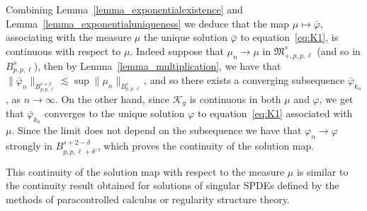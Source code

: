 \documentclass[a4paper,10pt]{article}
\begin{document}
\begin{remark}
  Combining Lemma~\ref{lemma_exponentialexistence} and
  Lemma~\ref{lemma_exponentialuniqueness} we deduce that the map $\mu
  \longmapsto \bar{\varphi}$, associating with the measure $\mu$ the unique
  solution $\bar{\varphi}$ to equation~{\eqref{eq:K1}}, is continuous with
  respect to $\mu$. Indeed suppose that $\mu_n \rightarrow \mu$ in
  $\mathfrak{M}^s_{+, p, p, \ell}$ (and so in $B^s_{p, p, \ell}$), then by
  Lemma~\ref{lemma_multiplication}, we have that $\| \bar{\varphi}_n \|_{B^{s
  + 2}_{p, p, \ell}} \lesssim \sup \| \mu_n \|_{B^s_{p, p, \ell}}$, and so
  there exists a converging subsequence $\bar{\varphi}_{k_n}$, as $n
  \rightarrow \infty$. On the other hand, since $\mathcal{K}_g$ is continuous
  in both $\mu$ and $\varphi$, we get that $\bar{\varphi}_{k_n}$ converges to
  the unique solution $\varphi$ to equation~{\eqref{eq:K1}} associated with
  $\mu .$ Since the limit does not depend on the subsequence we have that
  $\varphi_n \rightarrow \varphi$ strongly in $B^{s + 2 - \delta}_{p, p, \ell
  + \delta'}$, which proves the continuity of the solution map.
  
  This continuity of the solution map with respect to the measure $\mu$ is
  similar to the continuity result obtained for solutions of singular SPDEs
  defined by the methods of paracontrolled calculus or regularity structure
  theory. 
\end{remark}
\end{document}
